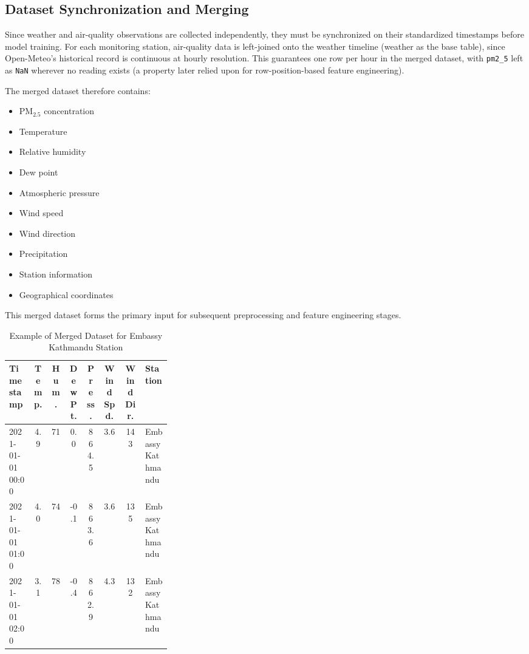 \subsection{Dataset Synchronization and Merging}

Since weather and air-quality observations are collected independently, they must be
synchronized on their standardized timestamps before model training. For each
monitoring station, air-quality data is left-joined onto the weather timeline
(weather as the base table), since Open-Meteo's historical record is continuous at
hourly resolution. This guarantees one row per hour in the merged dataset, with
\texttt{pm2\_5} left as \texttt{NaN} wherever no reading exists (a property later
relied upon for row-position-based feature engineering).

The merged dataset therefore contains:

\begin{itemize}
    \item PM$_{2.5}$ concentration
    \item Temperature
    \item Relative humidity
    \item Dew point
    \item Atmospheric pressure
    \item Wind speed
    \item Wind direction
    \item Precipitation
    \item Station information
    \item Geographical coordinates
\end{itemize}

This merged dataset forms the primary input for subsequent preprocessing and feature
engineering stages.

\begin{table}[H]
    \centering
    \footnotesize
    \caption{Example of Merged Dataset for Embassy Kathmandu Station}
    \label{tab:merged_dataset_sample}
    \renewcommand{\arraystretch}{1.3}
    \begin{tabular}{|p{0.15\linewidth}|c|c|c|c|c|c|p{0.16\linewidth}|}
        \hline
        \textbf{Timestamp} & \textbf{Temp.} & \textbf{Hum.} & \textbf{Dew Pt.} & \textbf{Press.} & \textbf{Wind Spd.} & \textbf{Wind Dir.} & \textbf{Station} \\
        \hline
        2021-01-01 00:00 & 4.9 & 71 & 0.0 & 864.5 & 3.6 & 143 & Embassy Kathmandu \\
        \hline
        2021-01-01 01:00 & 4.0 & 74 & -0.1 & 863.6 & 3.6 & 135 & Embassy Kathmandu \\
        \hline
        2021-01-01 02:00 & 3.1 & 78 & -0.4 & 862.9 & 4.3 & 132 & Embassy Kathmandu \\
        \hline
    \end{tabular}
\end{table}

